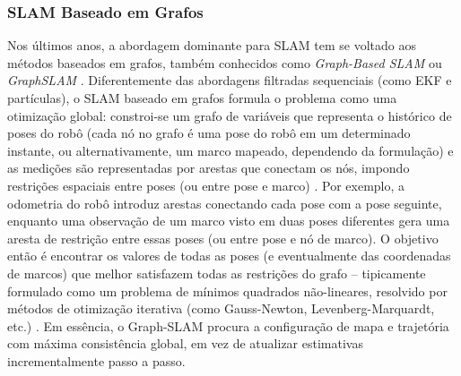         \subsubsection{SLAM Baseado em Grafos}
        
        Nos últimos anos, a abordagem dominante para SLAM tem se voltado aos métodos baseados em grafos, também conhecidos como \textit{Graph-Based SLAM} ou \textit{GraphSLAM} \cite{Grisetti2010}\cite{Labbe2014}. Diferentemente das abordagens filtradas sequenciais (como EKF e partículas), o SLAM baseado em grafos formula o problema como uma otimização global: constroi-se um grafo de variáveis que representa o histórico de poses do robô (cada nó no grafo é uma pose do robô em um determinado instante, ou alternativamente, um marco mapeado, dependendo da formulação) e as medições são representadas por arestas que conectam os nós, impondo restrições espaciais entre poses (ou entre pose e marco) \cite{Labbe2014}. Por exemplo, a odometria do robô introduz arestas conectando cada pose com a pose seguinte, enquanto uma observação de um marco visto em duas poses diferentes gera uma aresta de restrição entre essas poses (ou entre pose e nó de marco). O objetivo então é encontrar os valores de todas as poses (e eventualmente das coordenadas de marcos) que melhor satisfazem todas as restrições do grafo – tipicamente formulado como um problema de mínimos quadrados não-lineares, resolvido por métodos de otimização iterativa (como Gauss-Newton, Levenberg-Marquardt, etc.) \cite{Zhang2021}. Em essência, o Graph-SLAM procura a configuração de mapa e trajetória com máxima consistência global, em vez de atualizar estimativas incrementalmente passo a passo. 
        
